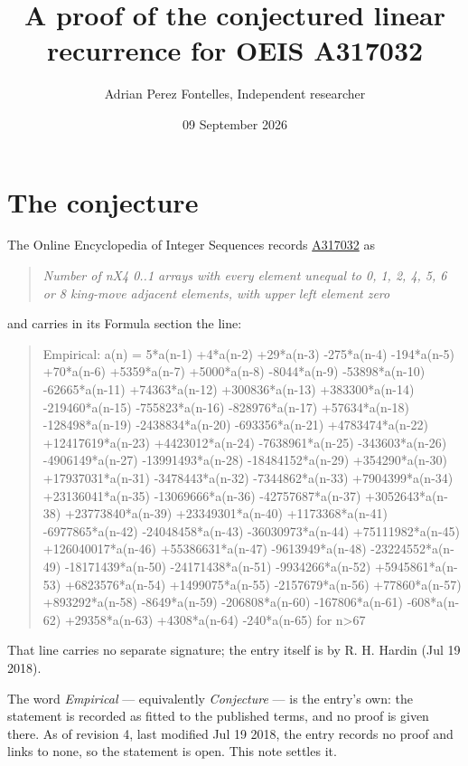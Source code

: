 \documentclass[11pt]{article}
\title{A proof of the conjectured linear recurrence for OEIS A317032}
\author{Adrian Perez Fontelles, Independent researcher}
\date{09 September 2026}
\theoremstyle{definition}
\begin{document}
\maketitle
\section{The conjecture}

The Online Encyclopedia of Integer Sequences records \href{https://oeis.org/A317032}{A317032} as

\begin{quote}\itshape Number of nX4 0..1 arrays with every element unequal to 0, 1, 2, 4, 5, 6 or 8 king-move adjacent elements, with upper left element zero\end{quote}

and carries in its Formula section the line:

\begin{quote}\ttfamily Empirical: a(n) = 5*a(n-1) +4*a(n-2) +29*a(n-3) -275*a(n-4) -194*a(n-5) +70*a(n-6) +5359*a(n-7) +5000*a(n-8) -8044*a(n-9) -53898*a(n-10) -62665*a(n-11) +74363*a(n-12) +300836*a(n-13) +383300*a(n-14) -219460*a(n-15) -755823*a(n-16) -828976*a(n-17) +57634*a(n-18) -128498*a(n-19) -2438834*a(n-20) -693356*a(n-21) +4783474*a(n-22) +12417619*a(n-23) +4423012*a(n-24) -7638961*a(n-25) -343603*a(n-26) -4906149*a(n-27) -13991493*a(n-28) -18484152*a(n-29) +354290*a(n-30) +17937031*a(n-31) -3478443*a(n-32) -7344862*a(n-33) +7904399*a(n-34) +23136041*a(n-35) -13069666*a(n-36) -42757687*a(n-37) +3052643*a(n-38) +23773840*a(n-39) +23349301*a(n-40) +1173368*a(n-41) -6977865*a(n-42) -24048458*a(n-43) -36030973*a(n-44) +75111982*a(n-45) +126040017*a(n-46) +55386631*a(n-47) -9613949*a(n-48) -23224552*a(n-49) -18171439*a(n-50) -24171438*a(n-51) -9934266*a(n-52) +5945861*a(n-53) +6823576*a(n-54) +1499075*a(n-55) -2157679*a(n-56) +77860*a(n-57) +893292*a(n-58) -8649*a(n-59) -206808*a(n-60) -167806*a(n-61) -608*a(n-62) +29358*a(n-63) +4308*a(n-64) -240*a(n-65) for n>67\end{quote}

That line carries no separate signature; the entry itself is by R. H. Hardin (Jul 19 2018).

The word {\itshape Empirical} --- equivalently {\itshape Conjecture} --- is the entry's own: the statement is recorded as fitted to the published terms, and no proof is given there. As of revision 4, last modified Jul 19 2018, the entry records no proof and links to none, so the statement is open. This note settles it.
\end{document}
